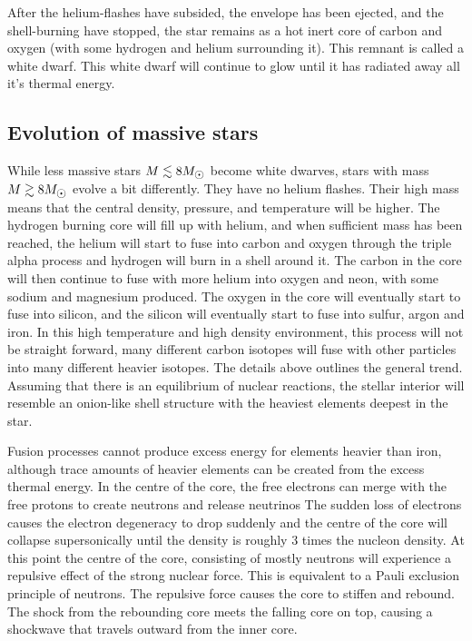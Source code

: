 After the helium-flashes have subsided, the envelope has been ejected, and the shell-burning have stopped, the star remains as a hot inert core of carbon and oxygen (with some hydrogen and helium surrounding it). This remnant is called a white dwarf.
This white dwarf will continue to glow until it has radiated away all it's thermal energy.

\subsection{Evolution of massive stars}
While less massive stars $M \lesssim 8 \msol$ become white dwarves, stars with mass $M \gtrsim 8 \msol$ evolve a bit differently.
They have no helium flashes.
Their high mass means that the central density, pressure, and temperature will be higher.
The hydrogen burning core will fill up with helium, and when sufficient mass has been reached, the helium will start to fuse into carbon and oxygen through the triple alpha process and hydrogen will burn in a shell around it.
The carbon in the core will then continue to fuse with more helium into oxygen and neon, with some sodium and magnesium produced.
The oxygen in the core will eventually start to fuse into silicon, and the silicon will eventually start to fuse into sulfur, argon and iron.
In this high temperature and high density environment, this process will not be straight forward, many different carbon isotopes will fuse with other particles into many different heavier isotopes. The details above outlines the general trend.
Assuming that there is an equilibrium of nuclear reactions, the stellar interior will resemble an onion-like shell structure with the heaviest elements deepest in the star.

Fusion processes cannot produce excess energy for elements heavier than iron, although trace amounts of heavier elements can be created from the excess thermal energy.
In the centre of the core, the free electrons can merge with the free protons to create neutrons and release neutrinos
The sudden loss of electrons causes the electron degeneracy to drop suddenly and the centre of the core will collapse supersonically until the density is roughly 3 times the nucleon density.
At this point the centre of the core, consisting of mostly neutrons will experience a repulsive effect of the strong nuclear force.
This is equivalent to a Pauli exclusion principle of neutrons.
The repulsive force causes the core to stiffen and rebound. The shock from the rebounding core meets the falling core on top, causing a shockwave that travels outward from the inner core.


